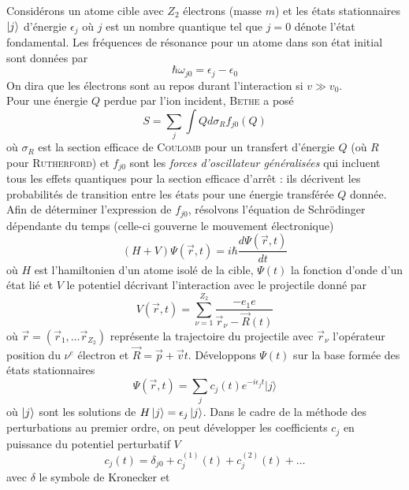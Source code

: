 Considérons un atome cible avec $Z_2$ électrons (masse $m$) et les états stationnaires $\ket j$ 
d'énergie $\epsilon_j$ où $j$ est un nombre quantique tel que $j=0$ dénote l'état fondamental. 
Les fréquences de résonance pour un atome dans son état initial sont données par
\begin{equation}
\hbar\omega_{j0}=\epsilon_j-\epsilon_0
\end{equation}
On dira que les électrons sont au repos durant l'interaction si $v\gg v_0$.
\\

Pour une énergie $Q$ perdue par l'ion incident, \textsc{Bethe} a posé
\begin{equation}
S=\sum_j\int Q d\sigma_Rf_{j0}(Q)
\end{equation}
où $\sigma_R$ est la section efficace de \textsc{Coulomb} pour un transfert d'énergie $Q$ 
(où $R$ pour \textsc{Rutherford}) et $f_{j0}$ sont les \textit{forces d'oscillateur généralisées}
qui incluent tous les effets quantiques pour la section efficace d'arrêt : ils décrivent les 
probabilités de transition entre les états pour une énergie transférée $Q$ donnée.\\

Afin de déterminer l'expression de $f_{j0}$, résolvons l'équation de Schrödinger dépendante du 
temps (celle-ci gouverne le mouvement électronique)
\begin{equation}
(H+V)\Psi(\overrightarrow{r},t)=i\hbar \frac{d\Psi(\overrightarrow{r},t)}{dt}
\end{equation}
où $H$ est l'hamiltonien d'un atome isolé de la cible, $\Psi(t)$ la fonction d'onde d'un état
lié et $V$ le potentiel décrivant l'interaction avec le projectile donné par
\begin{equation}
V(\overrightarrow{r},t)=\sum_{\nu=1}^{Z_2}\frac{-e_1e}{\overrightarrow{r}_\nu-\overrightarrow{R}(t)}
\end{equation}
où $\vec r = (\vec{r}_1,\dots \vec{r}_{Z_2})$ représente la trajectoire du projectile avec 
$\vec r_\nu$ l'opérateur position du $\nu^e$  électron et $\vec{R}=\vec{p}+\vec{v}t$. Développons
$\Psi(t)$ sur la base formée des états stationnaires
\begin{equation}
\Psi(\overrightarrow{r},t)=\sum_{j}c_j(t)e^{-i\epsilon_jt}|j\rangle
\end{equation}
où $\ket j$ sont les solutions de $H\ket j = \epsilon_j\ket j$. Dans le cadre de la méthode des
perturbations au premier ordre, on peut développer les coefficients $c_j$ en puissance du 
potentiel perturbatif $V$
\begin{equation}
c_j(t) = \delta_{j0} + c^{(1)}_j(t) + c^{(2)}_j(t) + \dots
\end{equation}
avec $\delta$ le symbole de Kronecker et

